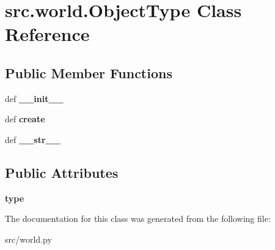\hypertarget{classsrc_1_1world_1_1_object_type}{\section{src.\-world.\-Object\-Type \-Class \-Reference}
\label{classsrc_1_1world_1_1_object_type}
}
\subsection*{\-Public \-Member \-Functions}
\begin{DoxyCompactItemize}
\item 
\hypertarget{classsrc_1_1world_1_1_object_type_ac8a8a5e2f760dc7ad47a122c2f81260a}{def {\bfseries \-\_\-\-\_\-init\-\_\-\-\_\-}}\label{classsrc_1_1world_1_1_object_type_ac8a8a5e2f760dc7ad47a122c2f81260a}

\item 
\hypertarget{classsrc_1_1world_1_1_object_type_ad802e763a2a37cccc20b98e1d6b35fb6}{def {\bfseries create}}\label{classsrc_1_1world_1_1_object_type_ad802e763a2a37cccc20b98e1d6b35fb6}

\item 
\hypertarget{classsrc_1_1world_1_1_object_type_a08d5b8ddd6761e8ac32f5c0bda5f9eae}{def {\bfseries \-\_\-\-\_\-str\-\_\-\-\_\-}}\label{classsrc_1_1world_1_1_object_type_a08d5b8ddd6761e8ac32f5c0bda5f9eae}

\end{DoxyCompactItemize}
\subsection*{\-Public \-Attributes}
\begin{DoxyCompactItemize}
\item 
\hypertarget{classsrc_1_1world_1_1_object_type_a9a72a17c18cf9dcf1e078609ca81aa3a}{{\bfseries type}}\label{classsrc_1_1world_1_1_object_type_a9a72a17c18cf9dcf1e078609ca81aa3a}

\end{DoxyCompactItemize}


\-The documentation for this class was generated from the following file\-:\begin{DoxyCompactItemize}
\item 
src/world.\-py\end{DoxyCompactItemize}
